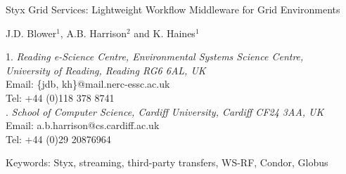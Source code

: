 \documentclass[a4paper]{article}
\begin{document}
\doublespacing

\begin{center}
{\Large Styx Grid Services: Lightweight Workflow Middleware for Grid Environments}

\bigskip
\bigskip

{\large J.D. Blower$^{1}$, A.B. Harrison$^{2}$ and K. Haines$^{1}$}

\bigskip

{\small 1. \textit{Reading e-Science Centre, Environmental Systems Science Centre, \\
University of Reading, Reading RG6 6AL, UK} \\
Email: \{jdb, kh\}@mail.nerc-essc.ac.uk\\
Tel: +44 (0)118 378 8741 \\
. \textit{School of Computer Science, Cardiff University, Cardiff CF24 3AA, UK}\\
Email: a.b.harrison@cs.cardiff.ac.uk\\
Tel: +44 (0)29 20876964}

\bigskip
\bigskip

Keywords: Styx, streaming, third-party transfers, WS-RF, Condor, Globus

\end{center}

\newpage

\begin{abstract}
The service-oriented approach to performing distributed scientific research is potentially very powerful but is not yet widely used in many scientific fields.  This is partly due to the technical difficulties involved in creating services and composing them into workflows.  We present the Styx Grid Service, a simple system that wraps command-line programs and allows them to be run over the Internet exactly as if they were local programs.  Styx Grid Services are very easy to create and use and can be composed into powerful workflows with simple shell scripts or more sophisticated graphical tools.  Data can be streamed directly from service to service and progress can be monitored asynchronously using a mechanism that places very few demands on firewalls.  Styx Grid Services can be used as an easy-to-use, uniform interface to Condor and Globus resources, permitting the creation of workflows that span various Grid resources and can be integrated with Web Services and the WS-RF specification.
\end{abstract}
\end{document}

